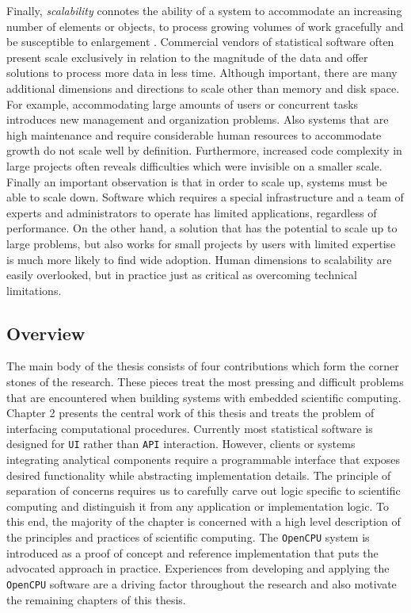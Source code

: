 Finally, \emph{scalability} connotes the ability of a system to accommodate an increasing number of elements or objects, to process growing volumes of work gracefully and be susceptible to enlargement \citep{bondi2000characteristics}. Commercial vendors of statistical software often present scale exclusively in relation to the magnitude of the data and offer solutions to process more data in less time. Although important, there are many additional dimensions and directions to scale other than memory and disk space. For example, accommodating large amounts of users or concurrent tasks introduces new management and organization problems. Also systems that are high maintenance and require considerable human resources to accommodate growth do not scale well by definition. Furthermore, increased code complexity in large projects often reveals difficulties which were invisible on a smaller scale. Finally an important observation is that in order to scale up, systems must be able to scale down. Software which requires a special infrastructure and a team of experts and administrators to operate has limited applications, regardless of performance. On the other hand, a solution that has the potential to scale up to large problems, but also works for small projects by users with limited expertise is much more likely to find wide adoption. Human dimensions to scalability are easily overlooked, but in practice just as critical as overcoming technical limitations.

\subsection{Overview}

The main body of the thesis consists of four contributions which form the corner stones of the research. These pieces treat the most pressing and difficult problems that are encountered when building systems with embedded scientific computing. Chapter 2 presents the central work of this thesis and treats the problem of interfacing computational procedures. Currently most statistical software is designed for \texttt{UI} rather than \texttt{API} interaction. However, clients or systems integrating analytical components require a programmable interface that exposes desired functionality while abstracting implementation details. The principle of separation of concerns requires us to carefully carve out logic specific to scientific computing and distinguish it from any application or implementation logic. To this end, the majority of the chapter is concerned with a high level description of the principles and practices of scientific computing. The \texttt{OpenCPU} system is introduced as a proof of concept and reference implementation that puts the advocated approach in practice. Experiences from developing and applying the \texttt{OpenCPU} software are a driving factor throughout the research and also motivate the remaining chapters of this thesis. 

